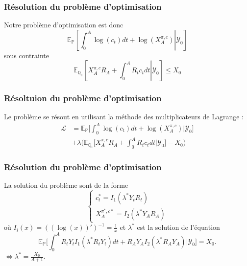 \documentclass{beamer}
\begin{document}
\begin{frame}
\frametitle{Résolution du problème d'optimisation}
Notre problème d'optimisation est donc 
\begin{equation*}
\mathbb{E}_{\mathbb{P}} \left[ \int_0^A \log  \left( c_t \right) dt + \log \left( X_A^{\pi, c}\right) \left\vert\right. \mathcal{Y}_0 \right]
\end{equation*}
sous contrainte 
\begin{equation*}
\mathbb{E}_{\mathbb{Q}_1} \left[ X_A^{\pi, c} R_A + \int_0^A R_t c_t dt \left\vert\right. \mathcal{Y}_0 \right] \leq X_0
\end{equation*}
\end{frame}

\begin{frame}
\frametitle{Résoltuion du problème d'optimisation}
Le problème se résout en utilisant la méthode des multiplicateurs de Lagrange :
\begin{align*}
\mathcal{L} &= \mathbb{E}_{\mathbb{P}} \big[ \int_{0}^{A} \log (c_t) dt + \log (X^{\pi, c}_A ) | \mathcal{Y}_0 \big] \\
&+ \lambda \Big( \mathbb{E}_{\mathbb{Q}_1} \big[ X^{\pi, c}_A R_A + \int_{0}^{A} R_t c_t dt | \mathcal{Y}_0 \big] - X_0 \Big)
\end{align*}

\end{frame}

\begin{frame}
\frametitle{Résolution du problème d'optimisation}
La solution du problème sont de la forme 
\begin{equation*}
\begin{cases} c^*_t = I_1 (\lambda^*Y_t R_t)\\
X^{\pi^*, c*}_A = I_2 (\lambda^* Y_A R_A)
\end{cases}
\end{equation*}
où $I_i(x) = ((\log(x))')^{-1} = \frac{1}{x}$ et $
\lambda^*$ est la solution de l'équation 
\begin{equation*}
\mathbb{E}_{\mathbb{P}} \Big[ \int_0^A R_t Y_t I_1(\lambda^* R_t Y_t)dt + R_A Y_A I_2(\lambda^* R_A Y_A ) | \mathcal{Y}_0 \Big] = X_0.
\end{equation*}
$ \Leftrightarrow \lambda^* = \frac{X_0}{A +1}$.
\end{frame}
\end{document}
